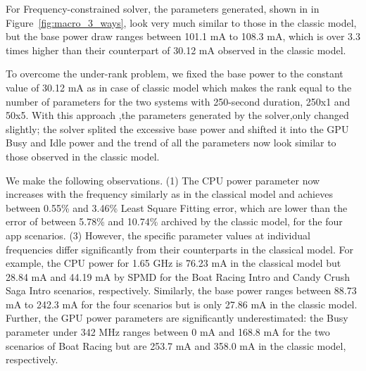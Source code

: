 For Frequency-constrained solver,  the parameters generated, shown in in Figure~\ref{fig:macro_3_ways}, look very much similar to those in the classic model, but 
the base power draw ranges between 101.1 mA to 108.3 mA, 
which is over 3.3 times higher than their counterpart of 30.12 mA observed in the classic model.

To overcome the under-rank problem, we fixed the base power to  the  constant value of 30.12 mA as in case of classic model which makes the rank equal to the  number of parameters for 
the two systems with 250-second duration, 250x1 and 50x5.  
With this approach ,the parameters generated by the solver,only changed slightly; the solver splited the excessive base power and shifted it into the GPU 
Busy and Idle power and the trend of all the parameters now look similar to those observed in the classic model. 
% 


We make the following observations.
(1) The CPU power parameter now increases with the frequency similarly as in the classical model
and achieves between 0.55\% and 3.46\% Least Square Fitting error, 
which are lower than the error of between 5.78\% and 10.74\% archived by 
the classic model, for the four app scenarios. 
(3) However, the specific parameter values at individual frequencies differ significantly from their counterparts in the classical model. For example, 
the CPU power for 1.65 GHz is 76.23 mA in the classical model
but 28.84 mA and 44.19 mA by SPMD for the Boat Racing Intro and Candy Crush Saga Intro scenarios, respectively. Similarly, the base power ranges between 88.73 mA to 242.3 mA for the four scenarios
but is only 27.86 mA in the classic model. 
Further, the GPU power parameters are significantly underestimated: the Busy parameter under 342 MHz
ranges between 0 mA and 168.8 mA  for the two scenarios of Boat Racing but are 253.7 mA and 358.0 mA in the classic model, respectively.
\fi

